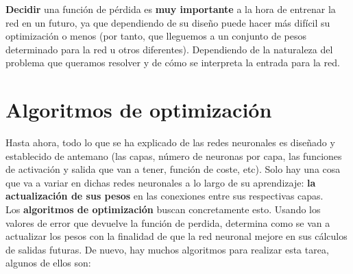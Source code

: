 \documentclass[11pt,fleqn]{book} %
\begin{document}
\textbf{Decidir} una función de pérdida es \textbf{muy importante} a la hora de entrenar la red en un futuro, ya que dependiendo de su diseño puede hacer más difícil su optimización o menos (por tanto, que lleguemos a un conjunto de pesos determinado para la red u otros diferentes). Dependiendo de la naturaleza del problema que queramos resolver y de cómo se interpreta la entrada para la red. \\

\section{Algoritmos de optimización}\label{sec:optimizacion}

Hasta ahora, todo lo que se ha explicado de las redes neuronales es diseñado y establecido de antemano (las capas, número de neuronas por capa, las funciones de activación y salida que van a tener, función de coste, etc). Solo hay una cosa que va a variar en dichas redes neuronales a lo largo de su aprendizaje: \textbf{la actualización de sus pesos} en las conexiones entre sus respectivas capas. \\

Los \textbf{algoritmos de optimización} buscan concretamente esto. Usando los valores de error que devuelve la función de perdida, determina como se van a actualizar los pesos con la finalidad de que la red neuronal mejore en sus cálculos de salidas futuras. De nuevo, hay muchos algoritmos para realizar esta tarea, algunos de ellos son: \\
\end{document}
